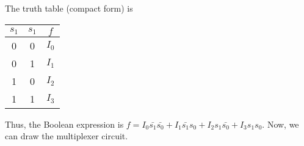 \documentclass[]{article}
\begin{document}
The truth table (compact form) is\bigbreak

\begin{center}
	\begin{tabular}{|c|c||c|}
		$s_1$ & $s_1$ & $f$\\\hline
		  0   &   0   & $I_0$\\
		  0   &   1   & $I_1$\\
		  1   &   0   & $I_2$\\
		  1   &   1   & $I_3$\\
	\end{tabular}
	\bigbreak
\end{center}

Thus, the Boolean expression is $f = I_0\bar{s_1}\bar{s_0} + I_1\bar{s_1}s_0 + I_2s_1\bar{s_0} + I_3s_1s_0$. Now, we can draw the multiplexer circuit.\\
\end{document}
